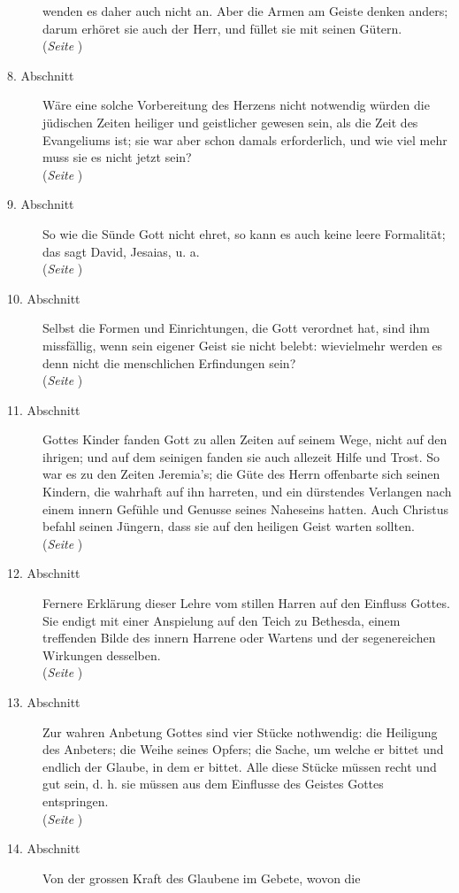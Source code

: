 \begin{description}
wenden es daher auch nicht an. Aber die Armen am Geiste denken anders; darum
erhöret sie auch der Herr, und füllet sie mit seinen Gütern.
\\(\textit{Seite \pageref{kap6_ab7}})
\item[8. Abschnitt] Wäre eine solche
Vorbereitung des Herzens nicht notwendig würden die jüdischen Zeiten heiliger
und geistlicher gewesen sein, als die Zeit des Evangeliums ist; sie war aber
schon damals erforderlich, und wie viel mehr muss sie es nicht jetzt sein?
\\(\textit{Seite \pageref{kap6_ab8}})
\item[9. Abschnitt] So wie die Sünde Gott nicht ehret, so kann es auch keine
leere Formalität; das sagt David, Jesaias, u. a.
\\(\textit{Seite \pageref{kap6_ab9}})
\item[10. Abschnitt] Selbst die Formen und Einrichtungen, die Gott verordnet
hat, sind ihm missfällig, wenn sein eigener Geist sie nicht belebt: wievielmehr
werden es denn nicht die menschlichen Erfindungen sein?
\\(\textit{Seite \pageref{kap6_ab10}})
\item[11. Abschnitt] Gottes Kinder fanden Gott zu allen Zeiten auf seinem Wege,
nicht auf den ihrigen; und auf dem seinigen fanden sie auch allezeit Hilfe und
Trost. So war es zu den Zeiten Jeremia's; die Güte des Herrn offenbarte sich
seinen Kindern, die wahrhaft auf ihn harreten, und ein dürstendes Verlangen nach
einem innern Gefühle und Genusse seines Naheseins hatten. Auch Christus befahl
seinen Jüngern, dass sie auf den heiligen Geist warten sollten.
\\(\textit{Seite \pageref{kap6_ab11}})
\item[12. Abschnitt] Fernere Erklärung dieser Lehre vom stillen Harren auf den
Einfluss Gottes. Sie endigt mit einer Anspielung auf den Teich zu Bethesda,
einem treffenden Bilde des innern Harrene oder Wartens und der segenereichen
Wirkungen desselben.
\\(\textit{Seite \pageref{kap6_ab12}})
\item[13. Abschnitt] Zur wahren Anbetung Gottes sind vier Stücke nothwendig: die
Heiligung des Anbeters; die Weihe seines Opfers; die Sache, um welche er bittet
und endlich der Glaube, in dem er bittet. Alle diese Stücke müssen recht und gut
sein, d. h. sie müssen aus dem Einflusse des Geistes Gottes entspringen.
\\(\textit{Seite \pageref{kap6_ab13}})
\item[14. Abschnitt] Von der grossen Kraft des Glaubene im Gebete, wovon die

\end{description}
